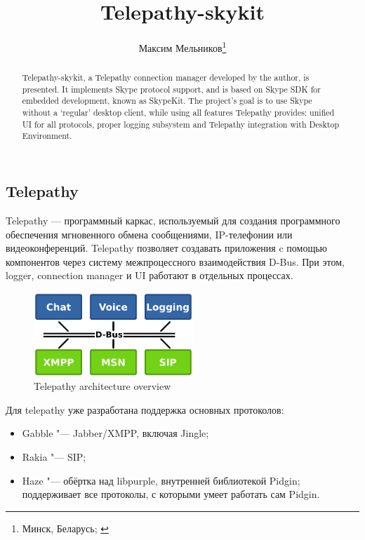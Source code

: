\documentclass[10pt, a5paper]{article}
\begin{document}
\title{Telepathy-skykit}%

\author{Максим Мельников\footnote{Минск, Беларусь; \url{}}}
\maketitle

\begin{abstract}
Telepathy-skykit, a Telepathy connection manager developed by the author, is presented. It implements Skype protocol support, and is based on Skype SDK for embedded development, known as SkypeKit. The project's goal is to use Skype without a `regular' desktop client, while using all features Telepathy provides: unified UI for all protocols, proper logging subsystem and Telepathy integration with Desktop Environment.
\end{abstract}

\subsection*{Telepathy}

Telepathy — программный каркас, используемый для создания программного обеспечения мгновенного обмена сообщениями, IP-телефонии или видеоконференций. Telepathy позволяет создавать приложения c помощью компонентов через систему межпроцессного взаимодействия D-Bus. При этом, logger, connection manager и UI работают в отдельных процессах.

\begin{figure}[t]
  \centering
  \includegraphics[width=6cm]{101_2013_w_Melnikau_tao}
  \caption{Telepathy architecture overview}
\end{figure}

Для telepathy уже разработана поддержка основных протоколов:
\begin{itemize}
\item Gabble "--- Jabber/XMPP, включая Jingle;
\item Rakia "--- SIP;
\item Haze "--- обёртка над libpurple, внутренней библиотекой Pidgin; поддерживает все протоколы, с которыми умеет работать сам Pidgin.
\end{itemize}
\end{document}

